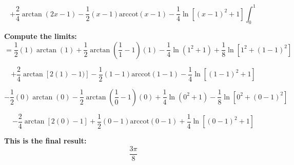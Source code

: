 \documentclass{article}
\begin{document}
\begin{equation*}
        +\frac{2}{4}\arctan(2x-1) -\frac{1}{2}(x-1) \text{arccot} (x-1) -\frac{1}{4}\ln{[(x-1)^2 +1]} \int_0^1
\end{equation*}

\bigskip\textbf{Compute the limits:}
\begin{equation*}
    =\frac{1}{2} (1) \arctan(1) +\frac{1}{2} \arctan(\frac{1}{1}-1) (1) -\frac{1}{4} \ln{(1^2 +1)} +\frac{1}{8} \ln{[1^2 +(1-1)^2]}
\end{equation*}

\begin{equation*}
        +\frac{2}{4}\arctan[2(1)-1)] -\frac{1}{2}(1-1) \text{arccot} (1-1) -\frac{1}{4}\ln{[(1-1)^2 +1]} 
\end{equation*}

\begin{equation*}
    -\frac{1}{2} (0) \arctan(0) -\frac{1}{2} \arctan(\frac{1}{0}-1) (0) +\frac{1}{4} \ln{(0^2 +1)} -\frac{1}{8} \ln{[0^2 +(0-1)^2]}
\end{equation*}

\begin{equation*}
        -\frac{2}{4}\arctan[2(0)-1] +\frac{1}{2}(0-1) \text{arccot} (0-1) +\frac{1}{4}\ln{[(0-1)^2 +1]}
\end{equation*}

\bigskip\textbf{This is the final result:}
\begin{equation*}
    \frac{3\pi}{8} 
\end{equation*}
\end{document}
